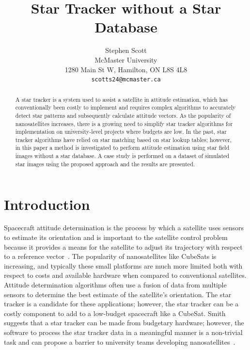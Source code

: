 \documentclass[10pt,twocolumn,letterpaper]{article}
\begin{document}
\title{Star Tracker without a Star Database}

\author{Stephen Scott\\
McMaster University\\
1280 Main St W, Hamilton, ON L8S 4L8\\
{\tt\small scotts24@mcmaster.ca}
}
\maketitle

\begin{abstract}
   A star tracker is a system used to assist a satellite in attitude estimation, which has conventionally been costly to implement and requires complex algorithms to accurately detect star patterns and subsequently calculate attitude vectors. As the popularity of nanosatellites increases, there is a growing need to simplify star tracker algorithms for implementation on university-level projects where budgets are low. In the past, star tracker algorithms have relied on star matching based on star lookup tables; however, in this paper a method is investigated to perform attitude estimation using star field images without a star database. A case study is performed on a dataset of simulated star images using the proposed approach and the results are presented.
\end{abstract}

\section{Introduction}
\label{sec:intro}

Spacecraft attitude determination is the process by which a satellite uses sensors to estimate its orientation and is important to the satellite control problem because it provides a means for the satellite to adjust its trajectory with respect to a reference vector~\cite{adcs}. The popularity of nanosatellites like CubeSats is increasing, and typically these small platforms are much more limited both with respect to costs and available hardware when compared to conventional satellites. Attitude determination algorithms often use a fusion of data from multiple sensors to determine the best estimate of the satellite's orientation. The star tracker is a candidate for these applications; however, the star tracker can be a costly component to add to a low-budget spacecraft like a CubeSat. Smith suggests that a star tracker can be made from budgetary hardware; however, the software to process the star tracker data in a meaningful manner is a non-trivial task and can propose a barrier to university teams developing nanosatellites~\cite{track_impl}. 
\end{document}
